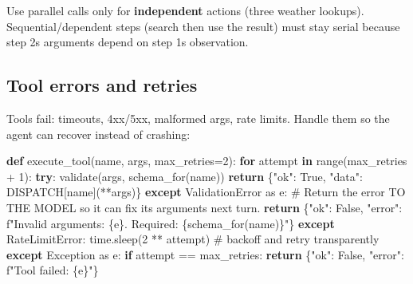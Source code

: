 \documentclass[11pt]{article}
\newenvironment{Shaded}{\begin{snugshade}}{\end{snugshade}}
\newcommand{\BuiltInTok}[1]{\textcolor[rgb]{0.50,0.55,0.55}{#1}}
\newcommand{\CommentTok}[1]{\textcolor[rgb]{0.48,0.49,0.49}{#1}}
\newcommand{\ControlFlowTok}[1]{\textcolor[rgb]{0.99,0.74,0.29}{\textbf{#1}}}
\newcommand{\DecValTok}[1]{\textcolor[rgb]{0.96,0.45,0.00}{#1}}
\newcommand{\ImportTok}[1]{\textcolor[rgb]{0.15,0.68,0.38}{#1}}
\newcommand{\KeywordTok}[1]{\textcolor[rgb]{0.81,0.81,0.76}{\textbf{#1}}}
\newcommand{\NormalTok}[1]{\textcolor[rgb]{0.81,0.81,0.76}{#1}}
\newcommand{\OperatorTok}[1]{\textcolor[rgb]{0.81,0.81,0.76}{#1}}
\newcommand{\PreprocessorTok}[1]{\textcolor[rgb]{0.15,0.68,0.38}{#1}}
\newcommand{\SpecialCharTok}[1]{\textcolor[rgb]{0.24,0.68,0.91}{#1}}
\newcommand{\SpecialStringTok}[1]{\textcolor[rgb]{0.85,0.27,0.33}{#1}}
\newcommand{\StringTok}[1]{\textcolor[rgb]{0.96,0.31,0.31}{#1}}
\newcommand{\VariableTok}[1]{\textcolor[rgb]{0.15,0.68,0.68}{#1}}
\begin{document}
Use parallel calls only for \textbf{independent} actions (three weather lookups). Sequential/dependent steps (search then use the result) must stay serial because step 2\textquotesingle s arguments depend on step 1\textquotesingle s observation.

\subsection{Tool errors and retries}\label{tool-errors-and-retries}

Tools fail: timeouts, 4xx/5xx, malformed args, rate limits. Handle them so the agent can recover instead of crashing:


\begin{Shaded}
\begin{Highlighting}[]
\KeywordTok{def}\NormalTok{ execute\_tool(name, args, max\_retries}\OperatorTok{=}\DecValTok{2}\NormalTok{):}
    \ControlFlowTok{for}\NormalTok{ attempt }\KeywordTok{in} \BuiltInTok{range}\NormalTok{(max\_retries }\OperatorTok{+} \DecValTok{1}\NormalTok{):}
        \ControlFlowTok{try}\NormalTok{:}
\NormalTok{            validate(args, schema\_for(name))}
            \ControlFlowTok{return}\NormalTok{ \{}\StringTok{"ok"}\NormalTok{: }\VariableTok{True}\NormalTok{, }\StringTok{"data"}\NormalTok{: DISPATCH[name](}\OperatorTok{**}\NormalTok{args)\}}
        \ControlFlowTok{except}\NormalTok{ ValidationError }\ImportTok{as}\NormalTok{ e:}
            \CommentTok{\# Return the error TO THE MODEL so it can fix its arguments next turn.}
            \ControlFlowTok{return}\NormalTok{ \{}\StringTok{"ok"}\NormalTok{: }\VariableTok{False}\NormalTok{, }\StringTok{"error"}\NormalTok{: }\SpecialStringTok{f"Invalid arguments: }\SpecialCharTok{\{}\NormalTok{e}\SpecialCharTok{\}}\SpecialStringTok{. Required: }\SpecialCharTok{\{}\NormalTok{schema\_for(name)}\SpecialCharTok{\}}\SpecialStringTok{"}\NormalTok{\}}
        \ControlFlowTok{except}\NormalTok{ RateLimitError:}
\NormalTok{            time.sleep(}\DecValTok{2} \OperatorTok{**}\NormalTok{ attempt)             }\CommentTok{\# backoff and retry transparently}
        \ControlFlowTok{except} \PreprocessorTok{Exception} \ImportTok{as}\NormalTok{ e:}
            \ControlFlowTok{if}\NormalTok{ attempt }\OperatorTok{==}\NormalTok{ max\_retries:}
                \ControlFlowTok{return}\NormalTok{ \{}\StringTok{"ok"}\NormalTok{: }\VariableTok{False}\NormalTok{, }\StringTok{"error"}\NormalTok{: }\SpecialStringTok{f"Tool failed: }\SpecialCharTok{\{}\NormalTok{e}\SpecialCharTok{\}}\SpecialStringTok{"}\NormalTok{\}}
\end{Highlighting}
\end{Shaded}
\end{document}
